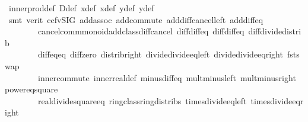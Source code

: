 \begin{isabellebody}
\ inner{\isacharunderscore}{\kern0pt}prod{\isacharunderscore}{\kern0pt}def\ D{\isacharunderscore}{\kern0pt}def\ x{}{\isacharunderscore}{\kern0pt}def\ x{}{\isacharunderscore}{\kern0pt}def\ y{}{\isacharunderscore}{\kern0pt}def\ y{}{\isacharunderscore}{\kern0pt}def\isanewline
\ \ \ \ \isamarkupfalse%
\ {\isacharparenleft}{\kern0pt}smt\ {\isacharparenleft}{\kern0pt}verit{\isacharcomma}{\kern0pt}\ ccfv{\isacharunderscore}{\kern0pt}SIG{\isacharparenright}{\kern0pt}\ add{\isachardot}{\kern0pt}assoc\ add{\isachardot}{\kern0pt}commute\ add{\isacharunderscore}{\kern0pt}diff{\isacharunderscore}{\kern0pt}cancel{\isacharunderscore}{\kern0pt}left{\isacharprime}{\kern0pt}\ add{\isacharunderscore}{\kern0pt}diff{\isacharunderscore}{\kern0pt}eq\isanewline
\ \ \ \ \ \ \ \ cancel{\isacharunderscore}{\kern0pt}comm{\isacharunderscore}{\kern0pt}monoid{\isacharunderscore}{\kern0pt}add{\isacharunderscore}{\kern0pt}class{\isachardot}{\kern0pt}diff{\isacharunderscore}{\kern0pt}cancel\ diff{\isacharunderscore}{\kern0pt}diff{\isacharunderscore}{\kern0pt}eq\ diff{\isacharunderscore}{\kern0pt}diff{\isacharunderscore}{\kern0pt}eq{}\ diff{\isacharunderscore}{\kern0pt}divide{\isacharunderscore}{\kern0pt}distrib\isanewline
\ \ \ \ \ \ \ \ diff{\isacharunderscore}{\kern0pt}eq{\isacharunderscore}{\kern0pt}eq\ diff{\isacharunderscore}{\kern0pt}zero\ distrib{\isacharunderscore}{\kern0pt}right\ divide{\isacharunderscore}{\kern0pt}divide{\isacharunderscore}{\kern0pt}eq{\isacharunderscore}{\kern0pt}left\ divide{\isacharunderscore}{\kern0pt}divide{\isacharunderscore}{\kern0pt}eq{\isacharunderscore}{\kern0pt}right\ fst{\isacharunderscore}{\kern0pt}swap\isanewline
\ \ \ \ \ \ \ \ inner{\isacharunderscore}{\kern0pt}commute\ inner{\isacharunderscore}{\kern0pt}real{\isacharunderscore}{\kern0pt}def\ minus{\isacharunderscore}{\kern0pt}diff{\isacharunderscore}{\kern0pt}eq\ mult{\isacharunderscore}{\kern0pt}minus{\isacharunderscore}{\kern0pt}left\ mult{\isacharunderscore}{\kern0pt}minus{\isacharunderscore}{\kern0pt}right\ power{}{\isacharunderscore}{\kern0pt}eq{\isacharunderscore}{\kern0pt}square\isanewline
\ \ \ \ \ \ \ \ real{\isacharunderscore}{\kern0pt}divide{\isacharunderscore}{\kern0pt}square{\isacharunderscore}{\kern0pt}eq\ ring{\isacharunderscore}{\kern0pt}class{\isachardot}{\kern0pt}ring{\isacharunderscore}{\kern0pt}distribs{\isacharparenleft}{\kern0pt}{}{\isacharparenright}{\kern0pt}\ times{\isacharunderscore}{\kern0pt}divide{\isacharunderscore}{\kern0pt}eq{\isacharunderscore}{\kern0pt}left\ times{\isacharunderscore}{\kern0pt}divide{\isacharunderscore}{\kern0pt}eq{\isacharunderscore}{\kern0pt}right\isanewline

\end{isabellebody}
